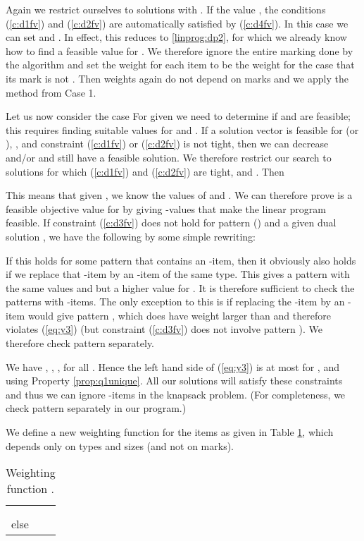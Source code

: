 {Again we restrict ourselves to solutions with .}
If the value , the conditions (\ref{c:d1fv}) and (\ref{c:d2fv}) are automatically satisfied by (\ref{c:d4fv}). In this case we can set  and . In effect, this reduces  to \ref{linprog:dp2}, for which we already know how to {find a feasible value for }. We therefore ignore the entire marking done by the algorithm and set the weight for each item to be the weight for the case that its mark is not . Then weights again do not depend on marks and we apply the method from Case 1. 


Let us now consider the case 
 For given  we need to determine if  and  are feasible; this requires finding suitable values for  and . If a solution vector  is feasible for  (or ), 
, and constraint (\ref{c:d1fv}) or (\ref{c:d2fv}) is not tight, then we can decrease  and/or  and still have a feasible solution.
We therefore restrict our search to
solutions for which (\ref{c:d1fv}) and (\ref{c:d2fv}) are tight, and .
Then 


This means that given , we know the values of  and . 
We can therefore prove  is a feasible objective value for  {by giving -values that make the linear program feasible.} 
If constraint (\ref{c:d3fv}) does not hold for pattern  () and a given dual solution , we have the
following by some simple rewriting:

If this holds for some pattern  that contains an -item, then it obviously also holds 
if we replace that -item by an -item of the same type.
This gives a pattern with the same values  and  but a higher value for .
It is therefore sufficient to check the patterns with -items.
The only exception to this is if replacing the -item by an -item would give pattern , which does have weight
larger than  and therefore violates (\ref{eq:y3}) (but constraint (\ref{c:d3fv}) does not involve pattern ).
We therefore check pattern  separately.

We have , 
,
,  for all .
Hence the left hand side of (\ref{eq:y3}) is at most  for , and 
using Property \ref{prop:q1unique}.
All our solutions will satisfy these constraints and thus we can ignore -items in the knapsack problem.
(For completeness, we check pattern  separately in our program.)



We define a new weighting function  for the items as given in Table \ref{tab:weights_knapsack},
which depends only on types and sizes (and not on marks).


\begin{table}[h]
	\caption{Weighting function .}
	\label{tab:weights_knapsack}
	\centering
	\begin{tabular}{l|l}
		 & \\
		\hline
		 &
		\\
		 & 
		
		\\
		else & 
	\end{tabular}
\end{table}



